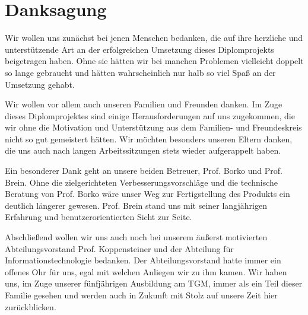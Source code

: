 \section*{Danksagung}
\cfoot{}
Wir wollen uns zunächst bei jenen Menschen bedanken, die auf ihre herzliche und unterstützende Art an der erfolgreichen Umsetzung dieses Diplomprojekts beigetragen haben. Ohne sie hätten wir bei manchen Problemen vielleicht doppelt so lange gebraucht und hätten wahrscheinlich nur halb so viel Spaß an der Umsetzung gehabt.

Wir wollen vor allem auch unseren Familien und Freunden danken. Im Zuge dieses Diplomprojektes sind einige Herausforderungen auf uns zugekommen, die wir ohne die Motivation und Unterstützung aus dem Familien- und Freundeskreis nicht so gut gemeistert hätten. Wir möchten besonders unseren Eltern danken, die uns auch nach langen Arbeitssitzungen stets wieder aufgerappelt haben.

Ein besonderer Dank geht an unsere beiden Betreuer, Prof. Borko und Prof. Brein. Ohne die zielgerichteten Verbesserungsvorschläge und die technische Beratung von Prof. Borko wäre unser Weg zur Fertigstellung des Produkts ein deutlich längerer gewesen. Prof. Brein stand uns mit seiner langjährigen Erfahrung und benutzerorientierten Sicht zur Seite.

Abschließend wollen wir uns auch noch bei unserem äußerst motivierten Abteilungsvorstand Prof. Koppensteiner und der Abteilung für Informationstechnologie bedanken. Der Abteilungsvorstand hatte immer ein offenes Ohr für uns, egal mit welchen Anliegen wir zu ihm kamen. Wir haben uns, im Zuge unserer fünfjährigen Ausbildung am TGM, immer als ein Teil dieser Familie gesehen und werden auch in Zukunft mit Stolz auf unsere Zeit hier zurückblicken.
